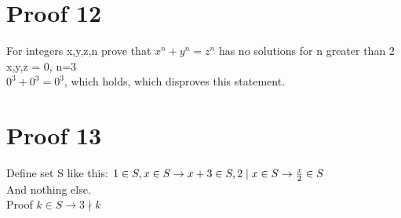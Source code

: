 \documentclass{article}
\begin{document}
\section{Proof 12}
For integers x,y,z,n prove that  $x^n+y^n=z^n$ has no solutions for n greater than 2\\
x,y,z = 0, n=3\\
$0^3 + 0^3 = 0^3$, which holds, which disproves this statement.


\section{Proof 13}
Define set S like this: $1 \in S,\\ x \in S \rightarrow x+3 \in S, \\2\mid x \in S \rightarrow \frac{x}{2} \in S$\\ And nothing else.\\
Proof $k \in S \rightarrow 3 \nmid k$ \\
\end{document}
